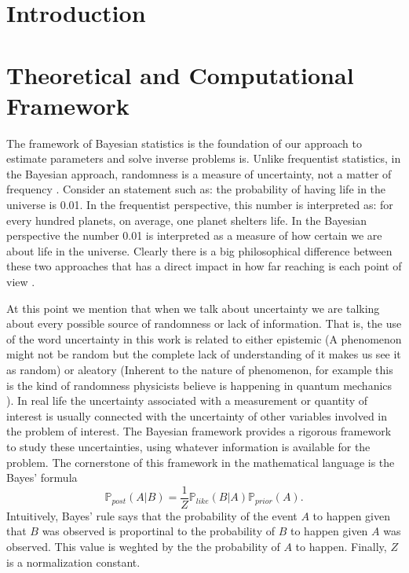 \documentclass[12pt]{book}
\newcommand{\post}{\mathbb{P}_{post}}
\newcommand{\like}{\mathbb{P}_{like}}
\newcommand{\prior}{\mathbb{P}_{prior}}
\begin{document}
\chapter{Introduction}

\newpage

\chapter{Theoretical and Computational Framework}


The framework of Bayesian statistics is the foundation of  our approach to estimate parameters and solve 
inverse problems is. Unlike frequentist statistics, in the Bayesian approach, randomness
is a measure of uncertainty,  not a matter of frequency . Consider an statement such  as:
the probability of having life in the universe is 0.01. In the frequentist
perspective, this number is interpreted as: for every hundred planets, on average, one planet shelters life.
 In the Bayesian
perspective the number 0.01 is interpreted as a measure of how certain we are about life in the universe. 
Clearly there is a big philosophical
difference between these two approaches that has a direct impact in how far reaching is each point of view  \cite{jaynes2003probability}.


At this point we mention that when we talk about uncertainty we are talking about every possible 
source of randomness  or  lack of information. That is, the use of the word uncertainty in this work
is related to either epistemic (A phenomenon might not be random but the complete lack of 
understanding of it makes us see it as random) or aleatory (Inherent to the nature of phenomenon, for 
example this is the kind of randomness physicists believe is happening in quantum mechanics
\cite{kennedy2001bayesian}). In real life the uncertainty associated with a  measurement or  quantity 
of interest is usually connected  with the uncertainty  of other variables involved in the problem of interest. 
The Bayesian framework provides a rigorous framework to study these uncertainties, 
using whatever information is available for the problem. The cornerstone of this framework
in the mathematical language is the  Bayes' formula 
\begin{equation}\label{eqnBayes}
\post(A|B)=\frac{1}{Z}\like(B|A)\prior(A).
\end{equation}
Intuitively, Bayes' rule says that the probability of the event $A$ to happen given that $B$ was observed is
proportinal to the probability of $B$ to happen given $A$ was observed. This value is weghted by the
the probability of $A$ to happen. Finally, $Z$ is a normalization constant.
\end{document}
